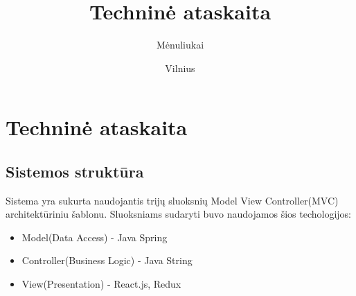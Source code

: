 \documentclass{VUMIFInfKursinis}
\title{Techninė ataskaita}
\author{Mėnuliukai}
\date{Vilnius \\ \the\year}
\begin{document}
\maketitle

\section{Techninė ataskaita}
\subsection{Sistemos struktūra}
Sistema yra sukurta naudojantis trijų sluoksnių Model View Controller(MVC) architektūriniu šablonu. Sluoksniams sudaryti buvo naudojamos šios techologijos:
\begin{itemize}
	\item{Model(Data Access) -  Java Spring}
	\item{Controller(Business Logic) - Java String}
	\item{View(Presentation) - React.js, Redux}
\end{itemize}  
\end{document}
